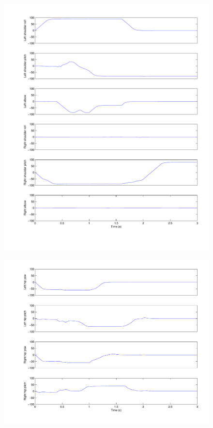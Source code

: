 \begin{figure}[htp]
\center
    \includegraphics[width = \textwidth]{figures/sup2proneArms}
    \caption[]{}
    \label{fig:sup2proneArms}
\end{figure}

\begin{figure}[htp]
\center
    \includegraphics[width = \textwidth]{figures/sup2proneLegs}
    \caption[]{}
    \label{fig:sup2proneLegs}
\end{figure}

